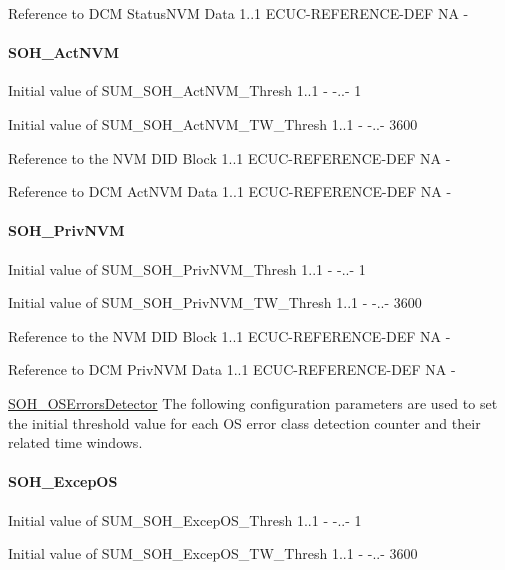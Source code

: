 {{{{{{{{{{{{{{
{Reference to DCM StatusNVM Data}
{1..1}
{ECUC-REFERENCE-DEF}
{NA}
{-}}

\paragraph{SOH\_ActNVM}
{
{Initial value of SUM_SOH_ActNVM_Thresh}
{1..1}
{-}
{-..-}
{1}}

{
{Initial value of SUM_SOH_ActNVM_TW_Thresh}
{1..1}
{-}
{-..-}
{3600}}

{
{Reference to the NVM DID Block}
{1..1}
{ECUC-REFERENCE-DEF}
{NA}
{-}}

{
{Reference to DCM ActNVM Data}
{1..1}
{ECUC-REFERENCE-DEF}
{NA}
{-}}

\paragraph{SOH\_PrivNVM}
{
{Initial value of SUM_SOH_PrivNVM_Thresh}
{1..1}
{-}
{-..-}
{1}}

{
{Initial value of SUM_SOH_PrivNVM_TW_Thresh}
{1..1}
{-}
{-..-}
{3600}}

{
{Reference to the NVM DID Block}
{1..1}
{ECUC-REFERENCE-DEF}
{NA}
{-}}

{
{Reference to DCM PrivNVM Data}
{1..1}
{ECUC-REFERENCE-DEF}
{NA}
{-}}


\underline{SOH\_OSErrorsDetector}\newline
The following configuration parameters are used to set the initial threshold value for each OS error class detection counter and their related time windows.
\vspace*{0.1in}

\paragraph{SOH_ExcepOS}
{
{Initial value of SUM_SOH_ExcepOS_Thresh}
{1..1}
{-}
{-..-}
{1}}

{
{Initial value of SUM_SOH_ExcepOS_TW_Thresh}
{1..1}
{-}
{-..-}
{3600}}

}}}}}}}}}}}}}
